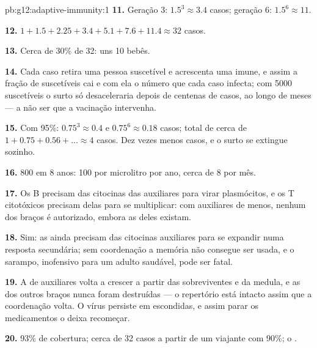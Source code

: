\begin{solution}{pb:g12:adaptive-immunity:1}
\textbf{11.} Geração 3: $1.5^3 \approx 3.4$ casos; geração 6:
$1.5^6 \approx 11$.

\textbf{12.} $1 + 1.5 + 2.25 + 3.4 + 5.1 + 7.6 + 11.4 \approx 32$ casos.

\textbf{13.} Cerca de 30\% de 32: uns 10 bebês.

\textbf{14.} Cada caso retira uma pessoa suscetível e acrescenta uma
imune, e assim a fração de suscetíveis cai e com ela o número que cada
caso infecta; com 5000 suscetíveis o surto só desaceleraria depois de
centenas de casos, ao longo de meses --- a não ser que a vacinação intervenha.

\textbf{15.} Com 95\%: $0.75^3 \approx 0.4$ e $0.75^6 \approx 0.18$
casos; total de cerca de $1 + 0.75 + 0.56 + \dots \approx 4$ casos. Dez
vezes menos casos, e o surto se extingue sozinho.

\textbf{16.} 800 em 8 anos: 100 por microlitro por ano, cerca de 8 por mês.

\textbf{17.} Os  B precisam das citocinas das 
auxiliares para virar plasmócitos, e os  T citotóxicos
precisam delas para se multiplicar: com auxiliares de menos, nenhum dos
braços é autorizado, embora as  deles existam.

\textbf{18.} Sim: as  ainda precisam das citocinas
auxiliares para se expandir numa resposta secundária; sem coordenação a
memória não consegue ser usada, e o sarampo, inofensivo para um adulto
saudável, pode ser fatal.

\textbf{19.} A  de auxiliares volta a crescer a partir das
 sobreviventes e da medula, e as  dos outros
braços nunca foram destruídas --- o repertório está intacto assim que a
coordenação volta. O vírus persiste em  escondidas, e assim
parar os medicamentos o deixa recomeçar.

\textbf{20.} 93\% de cobertura; cerca de 32 casos a partir de um
viajante com 90\%; o .
\end{solution}
